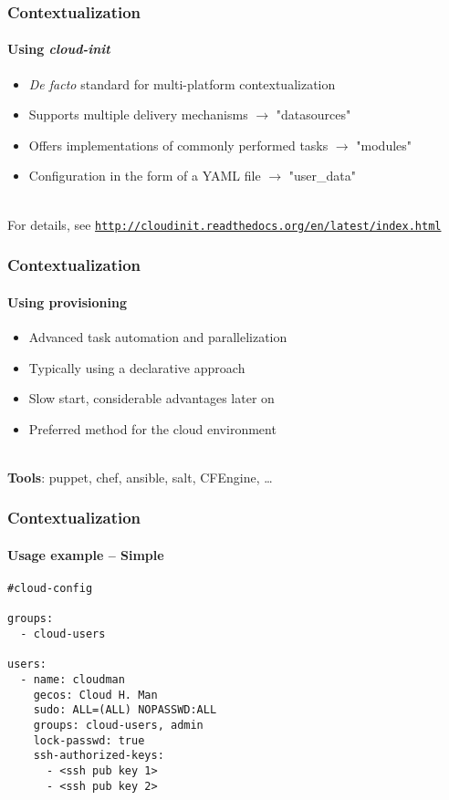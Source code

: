\begin{frame}
  \frametitle{Contextualization}
  \framesubtitle{Using \textit{cloud-init}}

  \begin{itemize}
    \item \textit{De facto} standard for multi-platform contextualization
    \item Supports multiple delivery mechanisms $\rightarrow$ "datasources"
    \item Offers implementations of commonly performed tasks $\rightarrow$ "modules"
    \item Configuration in the form of a YAML file $\rightarrow$ "user\_data"
  \end{itemize}

  \hfill\\

  For details, see \href{http://cloudinit.readthedocs.org/en/latest/index.html}{\nolinkurl{http://cloudinit.readthedocs.org/en/latest/index.html}}
\end{frame}

\begin{frame}
  \frametitle{Contextualization}
  \framesubtitle{Using provisioning}

  \begin{itemize}
    \item Advanced task automation and parallelization
    \item Typically using a declarative approach
    \item Slow start, considerable advantages later on
    \item Preferred method for the cloud environment
  \end{itemize}

  \hfill \\

  \textbf{Tools}: puppet, chef, ansible, salt, CFEngine, \dots
\end{frame}

\begin{frame}[fragile]
  \frametitle{Contextualization}
  \framesubtitle{Usage example -- Simple}

  \begin{lstlisting}
#cloud-config

groups:
  - cloud-users

users:
  - name: cloudman
    gecos: Cloud H. Man
    sudo: ALL=(ALL) NOPASSWD:ALL
    groups: cloud-users, admin
    lock-passwd: true
    ssh-authorized-keys:
      - <ssh pub key 1>
      - <ssh pub key 2>
  \end{lstlisting}
\end{frame}

